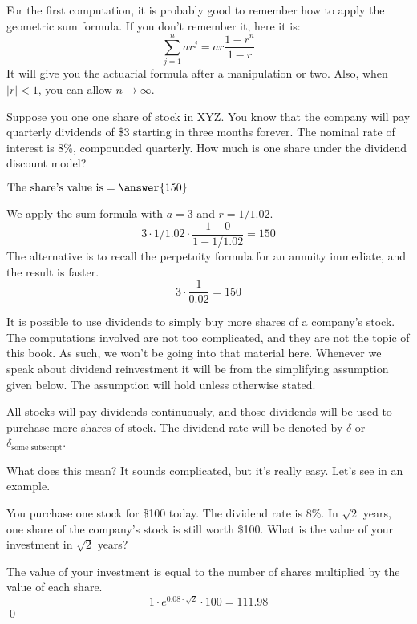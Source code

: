 \documentclass{ximera}
\begin{document}
For the first computation, it is probably good to remember how to apply the geometric sum formula. If you don't remember it, here it is:
\begin{equation*}
	\sum_{j=1}^nar^j=ar\frac{1-r^n}{1-r}
\end{equation*}
It will give you the actuarial formula after a manipulation or two. Also, when $|r|<1$, you can allow $n\to\infty$.
\begin{question}
Suppose you one one share of stock in XYZ. You know that the company will pay quarterly dividends of \$3 starting in three months forever. The nominal rate of interest is 8\%, compounded quarterly. How much is one share under the dividend discount model?
	\begin{prompt}
		$\text{The share's value is}=\answer{150}$
	\end{prompt}	
\end{question}

\begin{solution}
We apply the sum formula with $a=3$ and $r=1/1.02$.
	\begin{equation*}
		3\cdot 1/1.02\cdot\frac{1-0}{1-1/1.02}=150
	\end{equation*}
The alternative is to recall the perpetuity formula for an annuity immediate, and the result is faster.
	\begin{equation*}
		3\cdot\frac{1}{0.02}=150
	\end{equation*}
\end{solution}

It is possible to use dividends to simply buy more shares of a company's stock. The computations involved are not too complicated, and they are not the topic of this book. As such, we won't be going into that material here. Whenever we speak about dividend reinvestment it will be from the simplifying assumption given below. The assumption will hold unless otherwise stated.

\begin{ass}
All stocks will pay dividends continuously, and those dividends will be used to purchase more shares of stock. The dividend rate will be denoted by $\delta$ or $\delta_{\text{some subscript}}$.
\end{ass}

What does this mean? It sounds complicated, but it's really easy. Let's see in an example.

\begin{example}
You purchase one stock for \$100 today. The dividend rate is 8\%. In $\sqrt{2}$ years, one share of the company's stock is still worth \$100. What is the value of your investment in $\sqrt{2}$ years?

The value of your investment is equal to the number of shares multiplied by the value of each share.
	\begin{equation*}
		1\cdot e^{0.08\cdot\sqrt{2}}\cdot 100=111.98
	\end{equation*} 
	\qed
\end{example}
\end{document}
